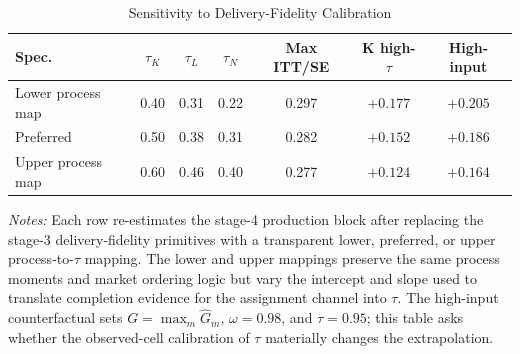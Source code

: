 \begin{table}[H]
\centering
\caption{Sensitivity to Delivery-Fidelity Calibration}
\label{tab:struct_tau_sensitivity}
\begin{threeparttable}
\footnotesize
\begin{tabular}[t]{lcccccc}
\toprule
Spec. & $\tau_K$ & $\tau_L$ & $\tau_N$ & Max ITT/SE & K high-$\tau$ & High-input \\
\midrule
Lower process map & 0.40 & 0.31 & 0.22 & 0.297 & $+0.177$ & $+0.205$ \\
Preferred & 0.50 & 0.38 & 0.31 & 0.282 & $+0.152$ & $+0.186$ \\
Upper process map & 0.60 & 0.46 & 0.40 & 0.277 & $+0.124$ & $+0.164$ \\
\bottomrule
\end{tabular}
\begin{tablenotes}
\footnotesize
\item \textit{Notes:} Each row re-estimates the stage-4 production block after replacing the stage-3 delivery-fidelity primitives with a transparent lower, preferred, or upper process-to-$\tau$ mapping. The lower and upper mappings preserve the same process moments and market ordering logic but vary the intercept and slope used to translate completion evidence for the assignment channel into $\tau$. The high-input counterfactual sets $G=\max_m\hat{G}_m$, $\omega=0.98$, and $\tau=0.95$; this table asks whether the observed-cell calibration of $\tau$ materially changes the extrapolation.
\end{tablenotes}
\end{threeparttable}
\end{table}
